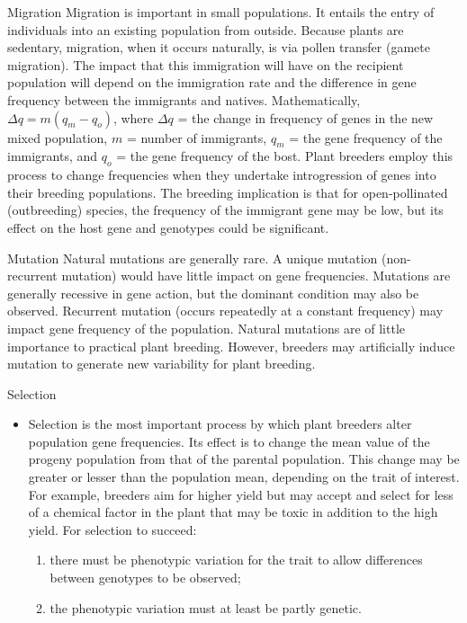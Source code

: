 \documentclass[11pt,dvipsnames,ignorenonframetext,aspectratio=169]{beamer}
\providecommand{\tightlist}{%
  \setlength{\itemsep}{0pt}\setlength{\parskip}{0pt}}
\begin{document}
\begin{frame}{Migration}
\protect\hypertarget{migration}{}
Migration is important in small populations. It entails the entry of
individuals into an existing population from outside. Because plants are
sedentary, migration, when it occurs naturally, is via pollen transfer
(gamete migration). The impact that this immigration will have on the
recipient population will depend on the immigration rate and the
difference in gene frequency between the immigrants and natives.
Mathematically, \(\Delta q = m(q_m - q_o)\), where \(\Delta q\) = the
change in frequency of genes in the new mixed population, \(m\) = number
of immigrants, \(q_m\) = the gene frequency of the immigrants, and
\(q_o\) = the gene frequency of the bost. Plant breeders employ this
process to change frequencies when they undertake introgression of genes
into their breeding populations. The breeding implication is that for
open-pollinated (outbreeding) species, the frequency of the immigrant
gene may be low, but its effect on the host gene and genotypes could be
significant.
\end{frame}

\begin{frame}{Mutation}
\protect\hypertarget{mutation}{}
Natural mutations are generally rare. A unique mutation (non-recurrent
mutation) would have little impact on gene frequencies. Mutations are
generally recessive in gene action, but the dominant condition may also
be observed. Recurrent mutation (occurs repeatedly at a constant
frequency) may impact gene frequency of the population. Natural
mutations are of little importance to practical plant breeding. However,
breeders may artificially induce mutation to generate new variability
for plant breeding.
\end{frame}

\begin{frame}{Selection}
\protect\hypertarget{selection}{}
\begin{itemize}
\tightlist
\item
  Selection is the most important process by which plant breeders alter
  population gene frequencies. Its effect is to change the mean value of
  the progeny population from that of the parental population. This
  change may be greater or lesser than the population mean, depending on
  the trait of interest. For example, breeders aim for higher yield but
  may accept and select for less of a chemical factor in the plant that
  may be toxic in addition to the high yield. For selection to succeed:

  \begin{enumerate}
  \tightlist
  \item
    there must be phenotypic variation for the trait to allow
    differences between genotypes to be observed;
  \item
    the phenotypic variation must at least be partly genetic.
  \end{enumerate}
\end{itemize}
\end{frame}
\end{document}
